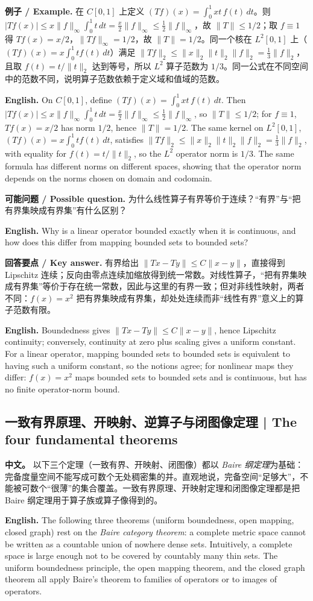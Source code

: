 \documentclass[UTF8,11pt,a4paper]{ctexart}
\newcommand{\EN}[1]{\par\noindent \textbf{English.} #1\par}
\newcommand{\EX}[2]{\par\noindent \textbf{例子 / Example.} #1\par\EN{#2}}
\newcommand{\ASK}[4]{\par\noindent \textbf{可能问题 / Possible question.} #1\par\EN{#2}\noindent \textbf{回答要点 / Key answer.} #3\par\EN{#4}\smallskip}
\newcommand{\APS}[2]{\par\noindent\textbf{中文。} #1\par\noindent\textbf{English.} #2\par\smallskip}
\begin{document}
\EX{在 $C[0,1]$ 上定义 $(Tf)(x)=\int_0^1xt\,f(t)\,dt$。则 $|Tf(x)|\le x\|f\|_\infty\int_0^1t\,dt=\frac{x}{2}\|f\|_\infty\le\frac12\|f\|_\infty$，故 $\|T\|\le1/2$；取 $f\equiv1$ 得 $Tf(x)=x/2$，$\|Tf\|_\infty=1/2$，故 $\|T\|=1/2$。同一个核在 $L^2[0,1]$ 上（$(Tf)(x)=x\int_0^1t f(t)\,dt$）满足 $\|Tf\|_2\le\|x\|_2\|t\|_2\|f\|_2=\frac13\|f\|_2$，且取 $f(t)=t/\|t\|_2$ 达到等号，所以 $L^2$ 算子范数为 $1/3$。同一公式在不同空间中的范数不同，说明算子范数依赖于定义域和值域的范数。}{On $C[0,1]$, define $(Tf)(x)=\int_0^1xt\,f(t)\,dt$. Then $|Tf(x)|\le x\|f\|_\infty\int_0^1t\,dt=\frac{x}{2}\|f\|_\infty\le\frac12\|f\|_\infty$, so $\|T\|\le1/2$; for $f\equiv1$, $Tf(x)=x/2$ has norm $1/2$, hence $\|T\|=1/2$. The same kernel on $L^2[0,1]$, $(Tf)(x)=x\int_0^1t f(t)\,dt$, satisfies $\|Tf\|_2\le\|x\|_2\|t\|_2\|f\|_2=\frac13\|f\|_2$, with equality for $f(t)=t/\|t\|_2$, so the $L^2$ operator norm is $1/3$. The same formula has different norms on different spaces, showing that the operator norm depends on the norms chosen on domain and codomain.}

\ASK{为什么线性算子有界等价于连续？“有界”与“把有界集映成有界集”有什么区别？}{Why is a linear operator bounded exactly when it is continuous, and how does this differ from mapping bounded sets to bounded sets?}{有界给出 $\|Tx-Ty\|\le C\|x-y\|$，直接得到 Lipschitz 连续；反向由零点连续加缩放得到统一常数。对线性算子，“把有界集映成有界集”等价于存在统一常数，因此与这里的有界一致；但对非线性映射，两者不同：$f(x)=x^2$ 把有界集映成有界集，却处处连续而非“线性有界”意义上的算子范数有限。}{Boundedness gives $\|Tx-Ty\|\le C\|x-y\|$, hence Lipschitz continuity; conversely, continuity at zero plus scaling gives a uniform constant. For a linear operator, mapping bounded sets to bounded sets is equivalent to having such a uniform constant, so the notions agree; for nonlinear maps they differ: $f(x)=x^2$ maps bounded sets to bounded sets and is continuous, but has no finite operator-norm bound.}

\subsection{一致有界原理、开映射、逆算子与闭图像定理 | The four fundamental theorems}
\APS{以下三个定理（一致有界、开映射、闭图像）都以 \emph{Baire 纲定理}为基础：完备度量空间不能写成可数个无处稠密集的并。直观地说，完备空间“足够大”，不能被可数个“很薄”的集合覆盖。一致有界原理、开映射定理和闭图像定理都是把 Baire 纲定理用于算子族或算子像得到的。}{The following three theorems (uniform boundedness, open mapping, closed graph) rest on the \emph{Baire category theorem}: a complete metric space cannot be written as a countable union of nowhere dense sets. Intuitively, a complete space is large enough not to be covered by countably many thin sets. The uniform boundedness principle, the open mapping theorem, and the closed graph theorem all apply Baire's theorem to families of operators or to images of operators.}
\end{document}
